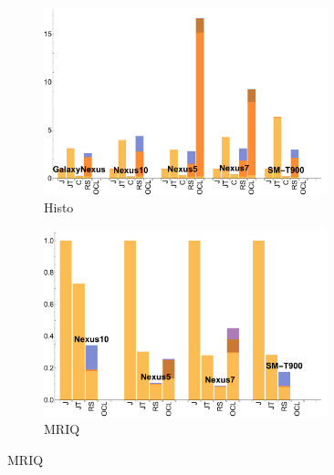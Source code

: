 \begin{figure}[ht]
  \begin{subfigure}[b]{0.5\textwidth}
      \centering
      \includegraphics[width=0.9\textwidth]{data/Histogram_onecompute_time.pdf}
      \caption{Histo}\label{fig:histo}
  \end{subfigure}
  \begin{subfigure}[b]{0.5\textwidth}
      \centering
      \includegraphics[width=0.9\textwidth]{data/Mriq_onecompute_time.pdf}
      \caption{MRIQ}
      \label{fig:MRIQ}
  \end{subfigure}


\end{figure}
